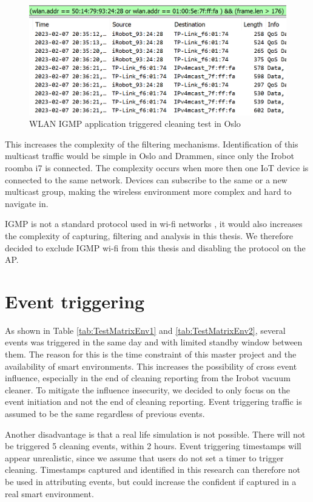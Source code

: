 \begin{figure}[H]
    \centering
    \includegraphics[width=\textwidth]{figures/WLAN_IGMP_ALL.png}
    \caption{WLAN IGMP application triggered cleaning test in Oslo}
    \label{fig:WLANIGMP_all_enabled}
\end{figure}

This increases the complexity of the filtering mechanisms. Identification of this multicast traffic would be simple in Oslo and Drammen, since only the Irobot roomba i7 is connected. The complexity occurs when more then one IoT device is connected to the same network. Devices can subscribe to the same or a new multicast group, making the wireless environment more complex and hard to navigate in. 

IGMP is not a standard protocol used in wi-fi networks \cite{wifi_ieee80211}, it would also increases the complexity of capturing, filtering and analysis in this thesis. We therefore decided to exclude IGMP wi-fi from this thesis and disabling the protocol on the AP. 

\section{Event triggering}
As shown in Table \ref{tab:TestMatrixEnv1} and \ref{tab:TestMatrixEnv2}, several events was triggered in the same day and with limited standby window between them. The reason for this is the time constraint of this master project and the availability of smart environments. This increases the possibility of cross event influence, especially in the end of cleaning reporting from the Irobot vacuum cleaner. To mitigate the influence insecurity, we decided to only focus on the event initiation and not the end of cleaning reporting. Event triggering traffic is assumed to be the same regardless of previous events. 

Another disadvantage is that a real life simulation is not possible. There will not be triggered 5 cleaning events, within 2 hours. Event triggering timestamps will appear unrealistic, since we assume that users do not set a timer to trigger cleaning. Timestamps captured and identified in this research can therefore not be used in attributing events, but could increase the confident if captured in a real smart environment. 

